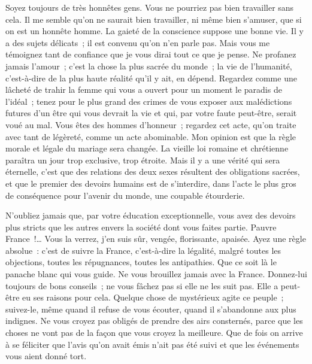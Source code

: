 \documentclass[french,twoside]{book} %
\newcommand\orgName[1]{#1}
\begin{document}
Soyez toujours de très honnêtes gens. Vous ne pourriez pas bien travailler sans cela. Il me semble qu’on ne saurait bien travailler, ni même bien s’amuser, que si on est un honnête homme. La gaieté de la conscience suppose une bonne vie. Il y a des sujets délicats ; il est convenu qu’on n’en parle pas. Mais vous me témoignez tant de confiance que je vous dirai tout ce que je pense. Ne profanez jamais l’amour ; c’est la chose la plus sacrée du monde ; la vie de l’humanité, c’est-à-dire de la plus haute réalité qu’il y ait, en dépend. Regardez comme une lâcheté de trahir la femme qui vous a ouvert pour un moment le paradis de l’idéal ; tenez pour le plus grand des crimes de vous exposer aux malédictions futures d’un être qui vous devrait la vie et qui, par votre faute peut-être, serait voué au mal. Vous êtes des hommes d’honneur ; regardez cet acte, qu’on traite avec tant de légèreté, comme un acte abominable. Mon opinion est que la règle morale et légale du mariage sera changée. La vieille loi romaine et chrétienne paraîtra un jour trop exclusive, trop étroite. Mais il y a une vérité qui sera éternelle, c’est que des relations des deux sexes résultent des obligations sacrées, et que le premier des devoirs humains est de s’interdire, dans l’acte le plus gros de conséquence pour l’avenir du monde, une coupable étourderie.\par
N’oubliez jamais que, par votre éducation exceptionnelle, vous avez des devoirs plus stricts que les autres envers la société dont vous faites partie. Pauvre {\orgName France} !… Vous la verrez, j’en suis sûr, vengée, florissante, apaisée. Ayez une règle absolue : c’est de suivre la {\orgName France}, c’est-à-dire la légalité, malgré toutes les objections, toutes les répugnances, toutes les antipathies. Que ce soit là le panache blanc qui vous guide. Ne vous brouillez jamais avec la {\orgName France}. Donnez-lui toujours de bons conseils ; ne vous fâchez pas si elle ne les suit pas. Elle a peut-être eu ses raisons pour cela. Quelque chose de mystérieux agite ce peuple ; suivez-le, même quand il refuse de vous écouter, quand il s’abandonne aux plus indignes. Ne vous croyez pas obligés de prendre des airs consternés, parce que les choses ne vont pas de la façon que vous croyez la meilleure. Que de fois on arrive à se féliciter que l’avis qu’on avait émis n’ait pas été suivi et que les événements vous aient donné tort.\par
\end{document}
